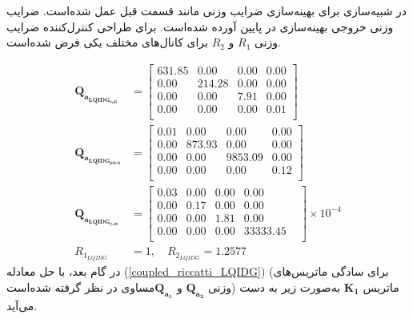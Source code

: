 در شبیه‌سازی برای بهینه‌سازی ضرایب وزنی مانند قسمت قبل عمل شده‌است. ضرایب وزنی خروجی بهینه‌سازی در پایین آورده شده‌است. برای طراحی کنترل‌کننده
ضرایب وزنی
$R_1$
و
$R_2$
برای کانال‌های مختلف یکی فرض شده‌است.

\begin{equation}
	\begin{split}
		\boldsymbol{Q_{a_{LQIDG_{roll}}}} &= \begin{bmatrix}
			631.85 & 0.00 & 0.00 & 0.00  \\ 
			0.00 & 214.28 & 0.00 & 0.00  \\ 
			0.00 & 0.00 & 7.91 & 0.00  \\ 
			0.00 & 0.00 & 0.00 & 0.01  \\ 
		\end{bmatrix} \\
		\boldsymbol{Q_{a_{LQIDG_{pitch}}}} &= \begin{bmatrix}
			0.01 & 0.00 & 0.00 & 0.00  \\
			0.00 & 873.93 & 0.00 & 0.00  \\ 
			0.00 & 0.00 & 9853.09 & 0.00 \\ 
			0.00 & 0.00 & 0.00 & 0.12  \\ 
		\end{bmatrix}\\
		\boldsymbol{Q_{a_{LQIDG_{yaw}}}}  &= \begin{bmatrix}
			0.03 & 0.00 & 0.00 & 0.00 & \\ 
			0.00 & 0.17 & 0.00 & 0.00 & \\ 
			0.00 & 0.00 & 1.81 & 0.00 & \\ 
			0.00 & 0.00 & 0.00 & 33333.45 & \\
		\end{bmatrix}\times 10^{-4}\\  R_{1_{LQIDG}} &= 1, \quad  R_{2_{LQIDG}} = 1.2577
	\end{split}
\end{equation}
در گام بعد، با حل معادله
(\ref{coupled_riccatti_LQIDG})
(برای سادگی ماتریس‌های وزنی $\boldsymbol{{Q}_{a_2}}$ و $\boldsymbol{{Q}_{a_1}}$مساوی در نظر گرفته شده‌است)
ماتریس
$\boldsymbol{{K}_1}$
به‌صورت زیر به دست می‌آید.
